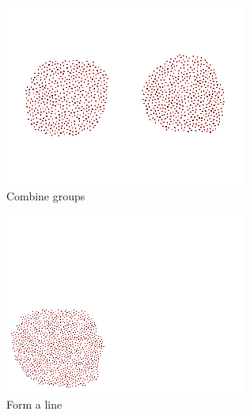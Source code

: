 \documentclass[]{article}
\begin{document}
\begin{figure}
	\ContinuedFloat
	\centering
	\begin{subfigure}{0.42\textwidth}
		\centering
		\includegraphics[width=\linewidth]{slide_images/Swarm_Robot_Control_-_1000_Robot_0019.png}
		\caption{Combine groups}
		\label{fig:sub1}
	\end{subfigure}%
	\begin{subfigure}{0.42\textwidth}
		\centering
		\includegraphics[width=\linewidth]{slide_images/Swarm_Robot_Control_-_1000_Robot_0021.png}
		\caption{Form a line}
		\label{fig:sub2}
	\end{subfigure}
	\begin{subfigure}{0.42\textwidth}
		\centering

\end{subfigure}
\end{figure}
\end{document}
